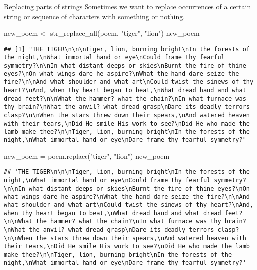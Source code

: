 \documentclass[
  10pt,
  ignorenonframetext,
  aspectratio=169]{beamer}
\newenvironment{Shaded}{\begin{snugshade}}{\end{snugshade}}
\newcommand{\FunctionTok}[1]{\textcolor[rgb]{0.94,0.94,0.56}{#1}}
\newcommand{\NormalTok}[1]{\textcolor[rgb]{0.80,0.80,0.80}{#1}}
\newcommand{\OperatorTok}[1]{\textcolor[rgb]{0.94,0.94,0.82}{#1}}
\newcommand{\OtherTok}[1]{\textcolor[rgb]{0.94,0.94,0.56}{#1}}
\newcommand{\StringTok}[1]{\textcolor[rgb]{0.80,0.58,0.58}{#1}}
\begin{document}
\begin{frame}[fragile]{Replacing parts of strings}
\protect\hypertarget{replacing-parts-of-strings}{}
Sometimes we want to replace occurrences of a certain string or sequence
of characters with something or nothing.

\medskip

\scriptsize

\begin{Shaded}
\begin{Highlighting}[]
\NormalTok{new\_poem }\OtherTok{\textless{}{-}} \FunctionTok{str\_replace\_all}\NormalTok{(poem, }\StringTok{"tiger"}\NormalTok{, }\StringTok{"lion"}\NormalTok{)}
\NormalTok{new\_poem}
\end{Highlighting}
\end{Shaded}

\begin{verbatim}
## [1] "THE TIGER\n\n\nTiger, lion, burning bright\nIn the forests of the night,\nWhat immortal hand or eye\nCould frame thy fearful symmetry?\n\nIn what distant deeps or skies\nBurnt the fire of thine eyes?\nOn what wings dare he aspire?\nWhat the hand dare seize the fire?\n\nAnd what shoulder and what art\nCould twist the sinews of thy heart?\nAnd, when thy heart began to beat,\nWhat dread hand and what dread feet?\n\nWhat the hammer? what the chain?\nIn what furnace was thy brain?\nWhat the anvil? what dread grasp\nDare its deadly terrors clasp?\n\nWhen the stars threw down their spears,\nAnd watered heaven with their tears,\nDid He smile His work to see?\nDid He who made the lamb make thee?\n\nTiger, lion, burning bright\nIn the forests of the night,\nWhat immortal hand or eye\nDare frame thy fearful symmetry?"
\end{verbatim}

\begin{Shaded}
\begin{Highlighting}[]
\NormalTok{new\_poem }\OperatorTok{=}\NormalTok{ poem.replace(}\StringTok{"tiger"}\NormalTok{, }\StringTok{"lion"}\NormalTok{)}
\NormalTok{new\_poem}
\end{Highlighting}
\end{Shaded}

\begin{verbatim}
## 'THE TIGER\n\n\nTiger, lion, burning bright\nIn the forests of the night,\nWhat immortal hand or eye\nCould frame thy fearful symmetry?\n\nIn what distant deeps or skies\nBurnt the fire of thine eyes?\nOn what wings dare he aspire?\nWhat the hand dare seize the fire?\n\nAnd what shoulder and what art\nCould twist the sinews of thy heart?\nAnd, when thy heart began to beat,\nWhat dread hand and what dread feet?\n\nWhat the hammer? what the chain?\nIn what furnace was thy brain?\nWhat the anvil? what dread grasp\nDare its deadly terrors clasp?\n\nWhen the stars threw down their spears,\nAnd watered heaven with their tears,\nDid He smile His work to see?\nDid He who made the lamb make thee?\n\nTiger, lion, burning bright\nIn the forests of the night,\nWhat immortal hand or eye\nDare frame thy fearful symmetry?'
\end{verbatim}
\end{frame}
\end{document}
